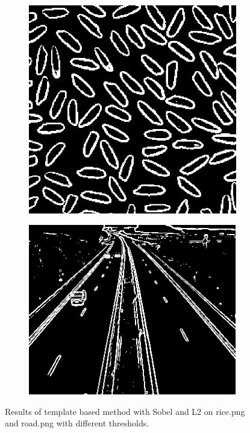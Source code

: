 \documentclass{article}
\begin{document}
\begin{figure}
        \centering
        \begin{subfigure}[b]{0.45\textwidth}
            \includegraphics[width=\textwidth]{Images/rice_sobel_l2.png}
        \end{subfigure}
        \hfill
        \begin{subfigure}[b]{0.45\textwidth}
            \includegraphics[width=\textwidth]{Images/road_sobel_l2.png}
        \end{subfigure}
        \caption{Results of template based method with Sobel and L2 on \textsf{rice.png} and \textsf{road.png} with different thresholds.}
        \label{fig:temp_rice_road}
\end{figure}
\end{document}
